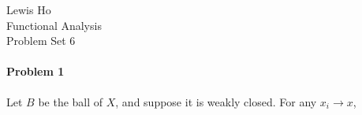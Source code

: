 \documentclass[12pt]{article}
\begin{document}
\begin{center}
  Lewis Ho\\
  Functional Analysis\\
  Problem Set 6
\end{center}

\paragraph{Problem 1}

Let $B$ be the ball of $X$, and suppose it is weakly closed. For any $x_i\to
x$, 

\end{document}
